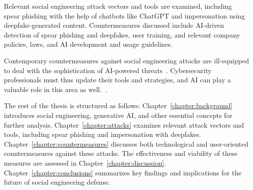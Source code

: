 %
%
Relevant social engineering attack vectors and tools are examined, including spear phishing with the help of chatbots like ChatGPT and impersonation using deepfake-generated content. Countermeasures discussed include AI-driven detection of spear phishing and deepfakes, user training, and relevant company policies, laws, and AI development and usage guidelines.


\newpage


%
%
Contemporary countermeasures against social engineering attacks are ill-equipped to deal with the sophistication of AI-powered threats~\citep{blauth_AI_Crime_Overview_Malicious_Use_Abuse_2022, king_AI_Crime_Interdisciplinary_Analysis_2019}. Cybersecurity professionals must thus update their tools and strategies, and AI can play a valuable role in this area as well.~\citep{fakhouri_AI_Driven_Solutions_SE_Attacks_2024, tsinganos_Towards_Automated_Recognition_Chat_SE_Enterprise_2018}.





%
%
The rest of the thesis is structured as follows: Chapter~\ref{chapter:background} introduces social engineering, generative AI, and other essential concepts for further analysis. Chapter~\ref{chapter:attacks} examines relevant attack vectors and tools, including spear phishing and impersonation with deepfakes. Chapter~\ref{chapter:countermeasures} discusses both technological and user-oriented countermeasures against these attacks. The effectiveness and viability of these measures are assessed in Chapter~\ref{chapter:discussion}. Chapter~\ref{chapter:conclusions} summarizes key findings and implications for the future of social engineering defense.
